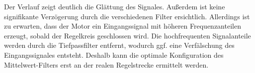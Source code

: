 Der Verlauf zeigt deutlich die Glättung des Signales. Außerdem ist keine signifikante Verzögerung durch die verschiedenen Filter ersichtlich. Allerdings ist zu erwarten, dass der Motor ein Eingangssignal mit höheren Frequenzanteilen erzeugt, sobald der Regelkreis geschlossen wird. Die hochfrequenten Signalanteile werden durch die Tiefpassfilter entfernt, wodurch ggf. eine Verfälschung des Eingangssignales entsteht. Deshalb kann die optimale Konfiguration des Mittelwert-Filters erst an der realen Regelstrecke ermittelt werden.